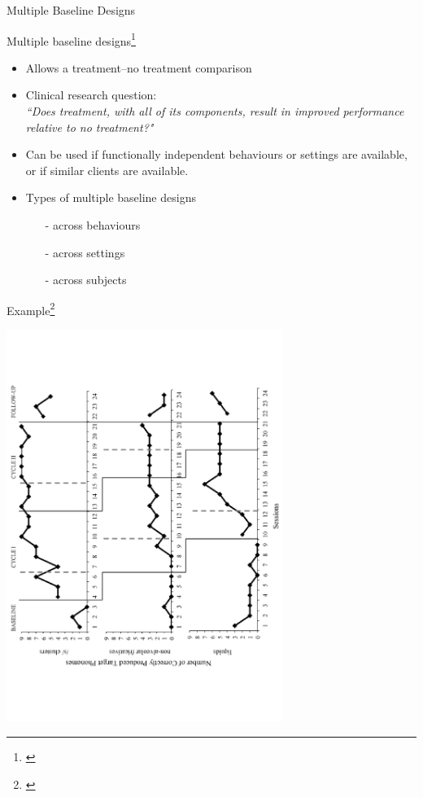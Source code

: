 \documentclass{beamer}
\begin{document}
\begin{frame}
\begin{center}
\Huge{Multiple Baseline Designs}
\end{center}
\end{frame}

% 
\begin{frame}{Multiple baseline designs\footnote{\tiny{\citet{Kearns1986}}}}
	\begin{itemize}
	\item Allows a treatment--no treatment comparison
	\item Clinical research question: \\
		 \emph{``Does \alert{treatment}, with all of its components, result in improved performance relative to \alert{no treatment?"}}
	\item Can be used if functionally independent behaviours or settings are available, or if similar clients are available.
	\item Types of multiple baseline designs
		\begin{itemize}
		\item[-] across behaviours
		\item[-] across settings
		\item[-] across subjects
		\end{itemize}
	\end{itemize}
\end{frame}

% 
\begin{frame}{Example\footnote{\tiny{\citet[Fig. 1]{Rudolph2014}}}}
	\begin{center}
	\includegraphics[angle=270, width=9cm]{images/rudolph_wendt_Fig1.pdf}
	\end{center}
\end{frame}
\end{document}
